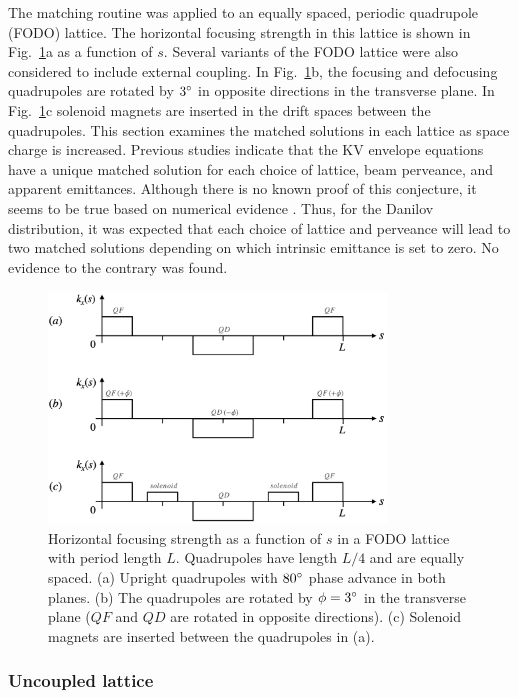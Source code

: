 The matching routine was applied to an equally spaced, periodic quadrupole (FODO) lattice. The horizontal focusing strength in this lattice is shown in Fig.~\ref{fig:fodo_lattices}a as a function of $s$. Several variants of the FODO lattice were also considered to include external coupling. In Fig.~\ref{fig:fodo_lattices}b, the focusing and defocusing quadrupoles are rotated by $3\degree$ in opposite directions in the transverse plane. In Fig.~\ref{fig:fodo_lattices}c solenoid magnets are inserted in the drift spaces between the quadrupoles. This section examines the matched solutions in each lattice as space charge is increased. Previous studies indicate that the KV envelope equations have a unique matched solution for each choice of lattice, beam perveance, and apparent emittances. Although there is no known proof of this conjecture, it seems to be true based on numerical evidence \cite{Lund2006}. Thus, for the Danilov distribution, it was expected that each choice of lattice and perveance will lead to two matched solutions depending on which intrinsic emittance is set to zero. No evidence to the contrary was found.
%
\begin{figure}[!p]
    \centering
    \includegraphics[width=0.8\textwidth]{Images/chapter2/fodo_lattices.png}
    \caption{Horizontal focusing strength as a function of $s$ in a FODO lattice with period length $L$. Quadrupoles have length $L/4$ and are equally spaced. (a) Upright quadrupoles with $80\degree$ phase advance in both planes. (b) The quadrupoles are rotated by $\phi = 3\degree$ in the transverse plane ($QF$ and $QD$ are rotated in opposite directions). (c) Solenoid magnets are inserted between the quadrupoles in (a).}
    \label{fig:fodo_lattices}
\end{figure}


\subsubsection{Uncoupled lattice}

